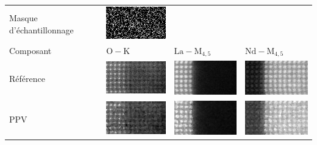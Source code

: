 \setlength{}

\begin{tabular}{m{2cm}*{3}{M{0.24\textwidth}}}
    Masque d'échantillonnage&
    \includegraphics[width=\tmplength]{img/chapitre4/figure9/img/mask.png}&
    &
    \\[30pt]
    Composant&
    {$\mathrm{O-K}$}&
    {$\mathrm{La-M}_{4, 5}$}&
    {$\mathrm{Nd-M}_{4, 5}$}\\
    Référence&
    \includegraphics[width=\tmplength]{img/chapitre4/figure9/img/GT_band_0.png}&
    \includegraphics[width=\tmplength]{img/chapitre4/figure9/img/GT_band_1.png}&
    \includegraphics[width=\tmplength]{img/chapitre4/figure9/img/GT_band_2.png}\\
    PPV&
    \includegraphics[width=\tmplength]{img/chapitre4/figure9/img/NN_band_0.png}&
    \includegraphics[width=\tmplength]{img/chapitre4/figure9/img/NN_band_1.png}&
    \includegraphics[width=\tmplength]{img/chapitre4/figure9/img/NN_band_2.png}\\

\end{tabular}
